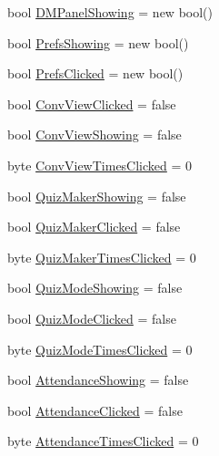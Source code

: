 \begin{DoxyCompactItemize}
\item 
bool \hyperlink{class_sr_p___classroom_inq_1_1frm_classrrom_inq_a7a4d3ad70d4284ad3f7d8ab3ca8718e0}{\-D\-M\-Panel\-Showing} = new bool()
\item 
bool \hyperlink{class_sr_p___classroom_inq_1_1frm_classrrom_inq_a915bf1ba42b54c697d1d90043610385f}{\-Prefs\-Showing} = new bool()
\item 
bool \hyperlink{class_sr_p___classroom_inq_1_1frm_classrrom_inq_a9e5a6ce376468f2e13dae9f60e86ccf6}{\-Prefs\-Clicked} = new bool()
\item 
bool \hyperlink{class_sr_p___classroom_inq_1_1frm_classrrom_inq_a567cf412a542927bb47984c0e835a7d2}{\-Conv\-View\-Clicked} = false
\item 
bool \hyperlink{class_sr_p___classroom_inq_1_1frm_classrrom_inq_a5b2fbbaa361339e096aa4be3f8e2b2dd}{\-Conv\-View\-Showing} = false
\item 
byte \hyperlink{class_sr_p___classroom_inq_1_1frm_classrrom_inq_a8b7285b1ee1626d8ebdc99d4bd6046a8}{\-Conv\-View\-Times\-Clicked} = 0
\item 
bool \hyperlink{class_sr_p___classroom_inq_1_1frm_classrrom_inq_a527e6e32ab67073ccbdb94297399ab2d}{\-Quiz\-Maker\-Showing} = false
\item 
bool \hyperlink{class_sr_p___classroom_inq_1_1frm_classrrom_inq_a80b43512315939f073e08cfea00ce796}{\-Quiz\-Maker\-Clicked} = false
\item 
byte \hyperlink{class_sr_p___classroom_inq_1_1frm_classrrom_inq_ae28b52f195f8e33470bb7bbc988ba622}{\-Quiz\-Maker\-Times\-Clicked} = 0
\item 
bool \hyperlink{class_sr_p___classroom_inq_1_1frm_classrrom_inq_a2be9d2ea6cc1cabf0dc6c6f3ee2544ce}{\-Quiz\-Mode\-Showing} = false
\item 
bool \hyperlink{class_sr_p___classroom_inq_1_1frm_classrrom_inq_af09c14bf56f313348d1e4a533fe515bf}{\-Quiz\-Mode\-Clicked} = false
\item 
byte \hyperlink{class_sr_p___classroom_inq_1_1frm_classrrom_inq_a0c88b881dc5ae86b5b3d5e04434b2ea8}{\-Quiz\-Mode\-Times\-Clicked} = 0
\item 
bool \hyperlink{class_sr_p___classroom_inq_1_1frm_classrrom_inq_a24415681575df1fd435d1b1da60dfde3}{\-Attendance\-Showing} = false
\item 
bool \hyperlink{class_sr_p___classroom_inq_1_1frm_classrrom_inq_a319172bf9b9e58ec37499658a5289284}{\-Attendance\-Clicked} = false
\item 
byte \hyperlink{class_sr_p___classroom_inq_1_1frm_classrrom_inq_ade18c1a241b76944c2731681e1767652}{\-Attendance\-Times\-Clicked} = 0

\end{DoxyCompactItemize}
